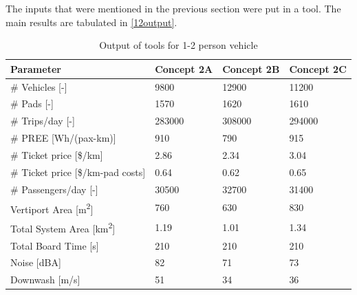 The inputs that were mentioned in the previous section were put in a tool. The main results are tabulated in \autoref{12output}.

\begin{table}[H]
\captionsetup{justification=centering}
\caption{Output of tools for 1-2 person vehicle}
\label{12output}
\begin{tabular}{@{}llll@{}}
\toprule
\textbf{Parameter}                           & \textbf{Concept 2A} & \textbf{Concept 2B} & \textbf{Concept 2C} \\ \midrule
\# Vehicles {[}-{]}                          &         9800          &        12900        &           11200         \\
\# Pads {[}-{]}                               &       1570           &    1620      &  1610  \\
\# Trips/day {[}-{]}                         &          283000          &     308000          &           294000         \\
\#  PREE {[}Wh/(pax-km){]}           &          910          &       790     &        915      \\
\# Ticket price {[}\$/km{]}                  & 2.86                   & 2.34                   & 3.04                    \\
\# Ticket price {[}\$/km-pad costs{]}        & 0.64                    & 0.62                   & 0.65                   \\
\# Passengers/day {[}-{]}                    &          30500          &     32700        &           31400        \\
Vertiport Area {[}m\textsuperscript{2}{]}    &          760          &      630        &           830      \\
Total System Area {[}km\textsuperscript{2}{]} &          1.19         &     1.01  &         1.34         \\
Total Board Time {[}s{]}                     &          210          &     210               &               210     \\
Noise {[}dBA{]}                              &             82       &     71          &           73        \\
Downwash {[}m/s{]}                              &             51       &     34          &           36        \\ \bottomrule
\end{tabular}
\end{table}

